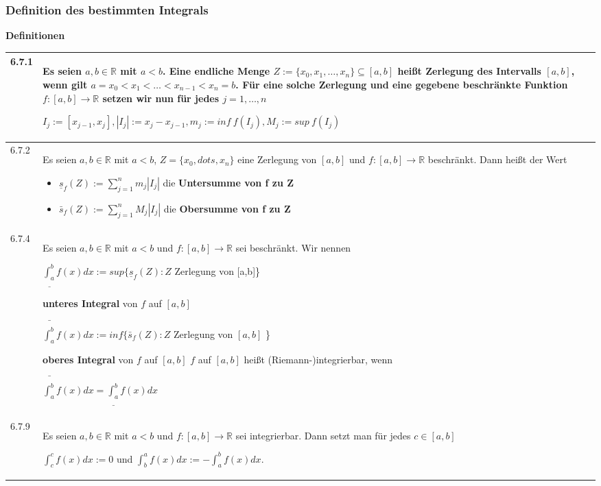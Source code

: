 \subsubsection{Definition des bestimmten Integrals}
    \noindent
    \textbf{Definitionen}
    \begin{table}[H]  
    \begin{tabularx}{\textwidth}{X m{16cm}}
        \toprule

        6.7.1 & Es seien $a,b \in \mathbb{R}$ mit $a < b$. Eine endliche Menge $Z:= \{ x_0, x_1, \dots, x_n \} \subseteq [a,b]$ heißt
                \textbf{Zerlegung} des Intervalls $[a,b]$, wenn gilt $a = x_0 < x_1 < \dots < x_{n-1} < x_n = b$. \hfill \break
                Für eine solche Zerlegung und eine gegebene beschränkte Funktion $f: [a,b] \rightarrow \mathbb{R}$ setzen wir nun
                für jedes $j = 1,\dots,n$ \hfill \break
                \centerline{$ I_j := [x_{j-1},x_j], |I_j| := x_j - x_{j-1}, m_j := inf~f(I_j), M_j := sup~f(I_j)$} \\
        \midrule
        6.7.2 & Es seien $a,b \in \mathbb{R}$ mit $a < b$, $Z = \{ x_0, dots, x_n\}$ eine Zerlegung von $[a,b]$ und $f:[a,b]\rightarrow \mathbb{R}$
                beschränkt. Dann heißt der Wert 
                \begin{itemize}[topsep=-0.5cm]
                    \item[] $\underline{s}_f(Z) := \sum^{n}_{j=1} m_j |I_j|$ die \textbf{Untersumme von f zu Z}
                    \item[] $\bar{s}_f(Z) := \sum^{n}_{j=1} M_j |I_j|$ die \textbf{Obersumme von f zu Z}
                \end{itemize} \vspace{-0cm} \\
        \midrule
        6.7.4 & Es seien $a, b \in \mathbb{R}$ mit $ a < b$ und $f: [a,b] \rightarrow \mathbb{R}$ sei beschränkt. \hfill \break
                Wir nennen \hfill \break
                \centerline{$ \underline{\int_a^b} f(x) dx:= sup\{ \underline{s}_f(Z):Z$ Zerlegung von [a,b]\}}
                \textbf{unteres Integral} von $f$ auf $[a,b]$ \hfill \break
                \centerline{$ \bar{\int^b_a}f(x) dx := inf\{ \bar{s}_f (Z): Z$ Zerlegung von $[a,b]$ \} }
                \textbf{oberes Integral} von $f$ auf $[a,b]$ \hfill \break
                $f$ auf $[a,b]$ heißt (Riemann-)integrierbar, wenn \hfill \break
                \centerline{$\bar{\int^b_a}f(x) dx = \underline{\int_a^b} f(x) dx$}\\
        \midrule
        6.7.9 & Es seien $a, b \in \mathbb{R}$ mit $a < b$ und $f: [a,b] \rightarrow \mathbb{R}$ sei integrierbar. Dann setzt man für jedes
                $ c \in [a,b]$ \hfill \break
                \centerline{$ \int_c^c f(x)dx := 0$ und $\int_b^a f(x) dx := - \int_a^b f(x) dx$.} \\
        

        \bottomrule

    \end{tabularx}
    \end{table}

